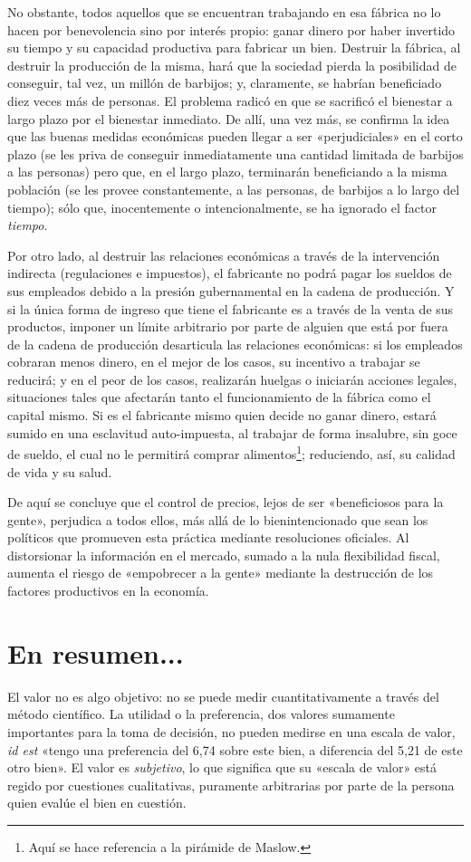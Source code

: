 \documentclass[12pt,a4paper,twoside]{book}
\begin{document}
No obstante, todos aquellos que se encuentran trabajando en esa fábrica no lo hacen por benevolencia sino por interés propio: ganar dinero por haber invertido su tiempo y su capacidad productiva para fabricar un bien. Destruir la fábrica, al destruir la producción de la misma, hará que la sociedad pierda la posibilidad de conseguir, tal vez, un millón de barbijos; y, claramente, se habrían beneficiado diez veces más de personas. El problema radicó en que se sacrificó el bienestar a largo plazo por el bienestar inmediato. De allí, una vez más, se confirma la idea que las buenas medidas económicas pueden llegar a ser «perjudiciales» en el corto plazo (se les priva de conseguir inmediatamente una cantidad limitada de barbijos a las personas) pero que, en el largo plazo, terminarán beneficiando a la misma población (se les provee constantemente, a las personas, de barbijos a lo largo del tiempo); sólo que, inocentemente o intencionalmente, se ha ignorado el factor \textit{tiempo}.

Por otro lado, al destruir las relaciones económicas a través de la intervención indirecta (regulaciones e impuestos), el fabricante no podrá pagar los sueldos de sus empleados debido a la presión gubernamental en la cadena de producción. Y si la única forma de ingreso que tiene el fabricante es a través de la venta de sus productos, imponer un límite arbitrario por parte de alguien que está por fuera de la cadena de producción desarticula las relaciones económicas: si los empleados cobraran menos dinero, en el mejor de los casos, su incentivo a trabajar se reducirá; y en el peor de los casos, realizarán huelgas o iniciarán acciones legales, situaciones tales que afectarán tanto el funcionamiento de la fábrica como el capital mismo. Si es el fabricante mismo quien decide no ganar dinero, estará sumido en una esclavitud auto-impuesta, al trabajar de forma insalubre, sin goce de sueldo, el cual no le permitirá comprar alimentos\footnote{Aquí se hace referencia a la pirámide de Maslow.}; reduciendo, así, su calidad de vida y su salud.

De aquí se concluye que el control de precios, lejos de ser «beneficiosos para la gente», perjudica a todos ellos, más allá de lo bienintencionado que sean los políticos que promueven esta práctica mediante resoluciones oficiales. Al distorsionar la información en el mercado, sumado a la nula flexibilidad fiscal, aumenta el riesgo de «empobrecer a la gente» mediante la destrucción de los factores productivos en la economía.

\section{En resumen...}
El valor no es algo objetivo: no se puede medir cuantitativamente a través del método científico. La utilidad o la preferencia, dos valores sumamente importantes para la toma de decisión, no pueden medirse en una escala de valor, \textit{id est} «tengo una preferencia del 6,74 sobre este bien, a diferencia del 5,21 de este otro bien». El valor es \textit{subjetivo}, lo que significa que su «escala de valor» está regido por cuestiones cualitativas, puramente arbitrarias por parte de la persona quien evalúe el bien en cuestión.
\end{document}
